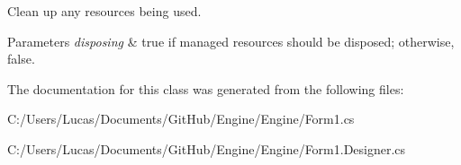 Clean up any resources being used. 


\begin{DoxyParams}{Parameters}
{\em disposing} & true if managed resources should be disposed; otherwise, false.\\
\hline
\end{DoxyParams}


The documentation for this class was generated from the following files\-:\begin{DoxyCompactItemize}
\item 
C\-:/\-Users/\-Lucas/\-Documents/\-Git\-Hub/\-Engine/\-Engine/Form1.\-cs\item 
C\-:/\-Users/\-Lucas/\-Documents/\-Git\-Hub/\-Engine/\-Engine/Form1.\-Designer.\-cs\end{DoxyCompactItemize}
